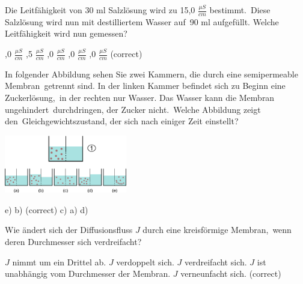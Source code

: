 \documentclass[11pt]{exam}
\begin{document}
\setlength{\voffset}{-0.5in}
\setlength{\headsep}{5pt}

\hspace{2mm}
 \hspace{5mm}
\vspace{4mm}

\begin{questions}

\question Die Leitfähigkeit von 30 ml Salzlösung wird zu 15,0 \( \frac{\mu S}{cm} \) bestimmt. Diese Salzlösung wird nun mit destilliertem Wasser auf 90 ml aufgefüllt. Welche Leitfähigkeit wird nun gemessen?

\begin{choices}
	,0 \( \frac{\mu S}{cm} \)
	,5 \( \frac{\mu S}{cm} \)
	,0 \( \frac{\mu S}{cm} \)
	,0 \( \frac{\mu S}{cm} \)
	,0 \( \frac{\mu S}{cm} \) (correct)
\end{choices}

\vspace{3mm}\question In folgender Abbildung sehen Sie zwei Kammern, die durch eine semipermeable Membran getrennt sind. In der linken Kammer befindet sich zu Beginn eine Zuckerlösung, in der rechten nur Wasser. Das Wasser kann die Membran ungehindert durchdringen, der Zucker nicht. Welche Abbildung zeigt den Gleichgewichtszustand, der sich nach einiger Zeit einstellt? 

\includegraphics[width=0.4\textwidth]{images/Osmose.png}

\begin{choices}
	\choice e)
	\choice b) (correct)
	\choice c)
	\choice a)
	\choice d)
\end{choices}

\vspace{3mm}\question Wie ändert sich der Diffusionsfluss \( J \) durch eine kreisförmige Membran, wenn deren Durchmesser sich verdreifacht?

\begin{choices}
	\choice \( J \) nimmt um ein Drittel ab.
	\choice \( J \) verdoppelt sich.
	\choice \( J \) verdreifacht sich.
	\choice \( J \) ist unabhängig vom Durchmesser der Membran.
	\choice \( J \) verneunfacht sich. (correct)
\end{choices}


\end{questions}
\end{document}
